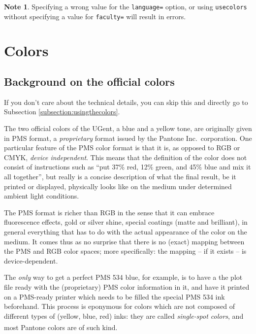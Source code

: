 \documentclass[a4paper,10pt]{article}
\theoremstyle{definition}
\newtheorem{note}{Note}
\begin{document}
\begin{note}
  Specifying a wrong value for the \verb|language=| option, or using \verb|usecolors| without specifying a value for \verb|faculty=| will result in errors.
\end{note}


\section{Colors}
\label{section:colors}

\subsection{Background on the official colors}
If you don't care about the technical details, you can skip this and directly go to Subsection \ref{subsection:usingthecolors}.

\vspace{1em}

The two official colors of the UGent, a blue and a yellow tone, are originally given in PMS format, a \emph{proprietary} format issued by the Pantone Inc.\ corporation. One particular feature of the PMS color format is that it is, as opposed to RGB or CMYK, \emph{device independent}. This means that the definition of the color does not consist of instructions such as \enquote{put 37\% red, 12\% green, and 45\% blue and mix it all together}, but really is a concise description of what the final result, be it printed or displayed, physically looks like on the medium under determined ambient light conditions.

The PMS format is richer than RGB in the sense that it can embrace fluorescence effects, gold or silver shine, special coatings (matte and brilliant), in general everything that has to do with the actual appearance of the color on the medium. It comes thus as no surprise that there is no (exact) mapping between the PMS and RGB color spaces; more specifically: the mapping -- if it exists -- is device-dependent.

The \emph{only} way to get a perfect PMS 534 blue, for example, is to have a the plot file ready with the (proprietary) PMS color information in it, and have it printed on a PMS-ready printer which needs to be filled the special PMS 534 ink beforehand. This process is eponymous for colors which are not composed of different types of (yellow, blue, red) inks: they are called \emph{single-spot colors}, and most Pantone\textsuperscript{\textregistered} colors are of such kind.
\end{document}
